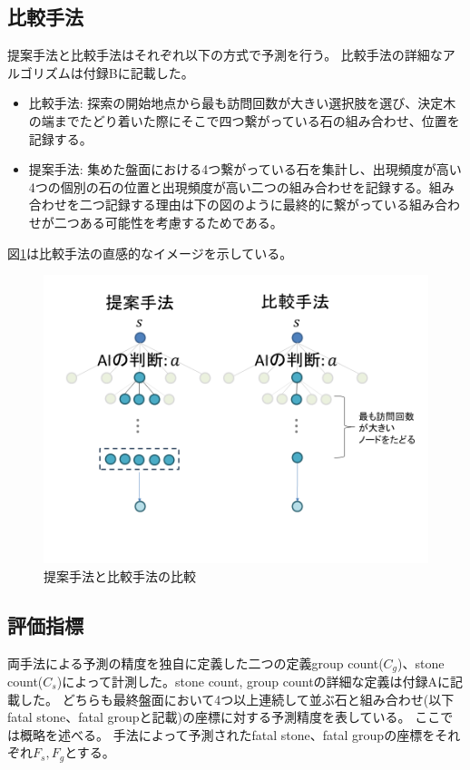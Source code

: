 \subsection{比較手法}
提案手法と比較手法はそれぞれ以下の方式で予測を行う。
比較手法の詳細なアルゴリズムは付録Bに記載した。
\begin{itemize}
	\item 比較手法: 探索の開始地点から最も訪問回数が大きい選択肢を選び、決定木の端までたどり着いた際にそこで四つ繋がっている石の組み合わせ、位置を記録する。
	\item 提案手法: 集めた盤面における4つ繋がっている石を集計し、出現頻度が高い4つの個別の石の位置と出現頻度が高い二つの組み合わせを記録する。組み合わせを二つ記録する理由は下の図のように最終的に繋がっている組み合わせが二つある可能性を考慮するためである。
\end{itemize}
図\ref{fig:compare}は比較手法の直感的なイメージを示している。
\begin{figure}[t]
	\centering
	\includegraphics[width=\linewidth]{./figure/compare.png}
	\caption{提案手法と比較手法の比較}
	\label{fig:compare}
\end{figure}

\subsection{評価指標}
両手法による予測の精度を独自に定義した二つの定義group count($C_g$)、stone count($C_s$)によって計測した。stone count, group countの詳細な定義は付録Aに記載した。
どちらも最終盤面において4つ以上連続して並ぶ石と組み合わせ(以下fatal stone、fatal groupと記載)の座標に対する予測精度を表している。
ここでは概略を述べる。
手法によって予測されたfatal stone、fatal groupの座標をそれぞれ$F_s, F_g$とする。
